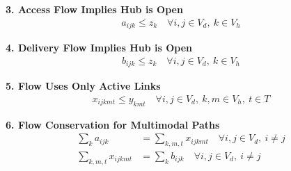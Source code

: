 \documentclass{article}
\begin{document}
\textbf{3. Access Flow Implies Hub is Open}
\begin{align*}
a_{ijk} \leq z_k \quad \forall i,j \in V_d,\ k \in V_h
\end{align*}

\textbf{4. Delivery Flow Implies Hub is Open}
\begin{align*}
b_{ijk} \leq z_k \quad \forall i,j \in V_d,\ k \in V_h
\end{align*}

\textbf{5. Flow Uses Only Active Links}
\begin{align*}
x_{ijkmt} \leq y_{kmt} \quad \forall i,j \in V_d,\ k,m \in V_h,\ t \in T
\end{align*}

\textbf{6. Flow Conservation for Multimodal Paths}
\begin{align*}
\sum_k a_{ijk} &= \sum_{k,m,t} x_{ijkmt} \quad \forall i,j \in V_d,\ i \neq j \\
\sum_{k,m,t} x_{ijkmt} &= \sum_k b_{ijk} \quad \forall i,j \in V_d,\ i \neq j
\end{align*}
\end{document}
